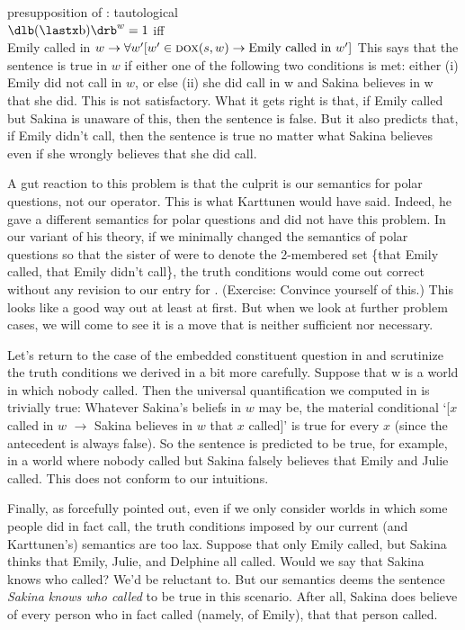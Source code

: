 \ex presupposition of \Last[b]: tautological\\
$\svt{\Last[b]}^{w} = 1$ iff\\
Emily called in
$w \rightarrow \forall w' [w'\in\textsc{dox}(s,w) \rightarrow \text{Emily called
  in}\ w']$
\xe
%
This says that the sentence \LLast[a] is true in $w$ if either one of the
following two conditions is met: either (i) Emily did not call in $w$, or else
(ii) she did call in w and Sakina believes in w that she did. This is not
satisfactory. What it gets right is that, if Emily called but Sakina is unaware
of this, then the sentence is false. But it also predicts that, if Emily didn't
call, then the sentence is true no matter what Sakina believes \dash even if she
wrongly believes that she did call.

A gut reaction to this problem is that the culprit is our semantics for polar
questions, not our \ans operator. This is what Karttunen would have said.
Indeed, he gave a different semantics for polar questions and did not have this
problem. %
%
In our variant of his theory, if we minimally changed the semantics of polar
questions so that the sister of \ans were to denote the 2-membered set \{that
Emily called, that Emily didn't call\}, the truth conditions would come out
correct without any revision to our entry for \ans. (Exercise: Convince yourself
of this.) This looks like a good way out \dash at least at first. But when we
look at further problem cases, we will come to see it is a move that is neither
sufficient nor necessary.

Let's return to the case of the embedded constituent question in
 and scrutinize the truth conditions we derived in
 a bit more carefully. Suppose that w is a world in
which nobody called. Then the universal quantification we computed in
 is trivially true: Whatever Sakina's beliefs in $w$
may be, the material conditional `[$x$ called in $w$ $\rightarrow$ Sakina
believes in $w$ that $x$ called]' is true for every $x$ (since the antecedent is
always false). So the sentence  is predicted to be true, for
example, in a world where nobody called but Sakina falsely believes that Emily
and Julie called. This does not conform to our intuitions.

Finally, as \cite{groenendijk-stokhof-1982-wh-complements} forcefully pointed
out, even if we only consider worlds in which some people did in fact call, the
truth conditions imposed by our current (and Karttunen's) semantics are too lax.
Suppose that only Emily called, but Sakina thinks that Emily, Julie, and
Delphine all called. Would we say that Sakina knows who called? We'd be
reluctant to. But our semantics deems the sentence \emph{Sakina knows who
  called} to be true in this scenario. After all, Sakina does believe of every
person who in fact called (namely, of Emily), that that person called.


